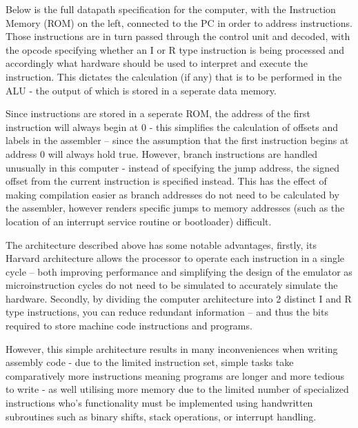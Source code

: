 \bigskip


\bigskip

Below is the full datapath specification for the computer, with the Instruction Memory (ROM) on the left, connected to the PC in order to address instructions. Those instructions are in turn passed through the control unit and decoded, with the opcode specifying whether an I or R type instruction is being processed and accordingly what hardware should be used to interpret and execute the instruction. This dictates the calculation (if any) that is to be performed in the ALU - the output of which is stored in a seperate data memory.

Since instructions are stored in a seperate ROM, the address of the first instruction will always begin at 0 - this simplifies the calculation of offsets and labels in the assembler – since the assumption that the first instruction begins at address 0 will always hold true. However, branch instructions are handled unusually in this computer - instead of specifying the jump address, the signed offset from the current instruction is specified instead. This has the effect of making compilation easier as branch addresses do not need to be calculated by the assembler, however renders specific jumps to memory addresses (such as the location of an interrupt service routine or bootloader) difficult.

\bigskip


The architecture described above has some notable advantages, firstly, its Harvard architecture allows the processor to operate each instruction in a single cycle – both improving performance and simplifying the design of the emulator as microinstruction cycles do not need to be simulated  to accurately simulate the hardware. Secondly, by dividing the computer architecture into 2 distinct I and R type instructions, you can reduce redundant information – and thus the bits required to store machine code instructions and programs.

However, this simple architecture results in many inconveniences when writing assembly code - due to the limited instruction set, simple tasks take comparatively more instructions meaning programs are longer and more tedious to write - as well utilising more memory due to the limited number of specialized instructions who's functionality must be implemented using handwritten subroutines such as binary shifts, stack operations, or interrupt handling. 

